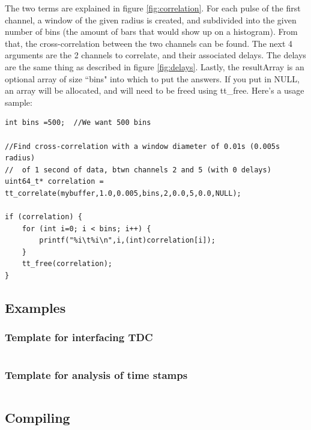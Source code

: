 \documentclass[10pt]{article}
\begin{document}
The two terms are explained in figure \ref{fig:correlation}. For each pulse of the first channel, a window of the given radius is created, and subdivided into the given number of bins (the amount of bars that would show up on a histogram).
From that, the cross-correlation between the two channels can be found.
The next 4 arguments are the 2 channels to correlate, and their associated delays. The delays are the same thing as described in figure \ref{fig:delays}.
Lastly, the resultArray is an optional array of size ``bins" into which to put the answers. If you put in NULL, an array will be allocated, and will need to
be freed using tt\_free. Here's a usage sample:

\begin{verbatim}
int bins =500;  //We want 500 bins

//Find cross-correlation with a window diameter of 0.01s (0.005s radius)
//  of 1 second of data, btwn channels 2 and 5 (with 0 delays)
uint64_t* correlation = tt_correlate(mybuffer,1.0,0.005,bins,2,0.0,5,0.0,NULL);

if (correlation) {
    for (int i=0; i < bins; i++) {
        printf("%i\t%i\n",i,(int)correlation[i]);
    }
    tt_free(correlation);
}
\end{verbatim}



\subsection{Examples}
\subsubsection{Template for interfacing TDC}

\inputminted[mathescape,bgcolor=bg]{c}{Examples/interfacing_timetagger.c}

\subsubsection{Template for analysis of time stamps}

\inputminted[mathescape,bgcolor=bg]{c}{Examples/using_timetags.c}

\subsection{Compiling}
\end{document}
